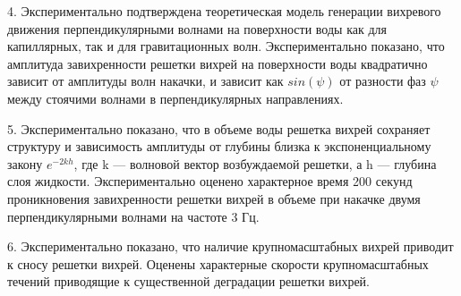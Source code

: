 4. Экспериментально подтверждена теоретическая модель генерации вихревого движения перпендикулярными волнами на поверхности воды как для капиллярных, так и для гравитационных волн. Экспериментально показано, что амплитуда завихренности решетки вихрей на поверхности воды квадратично зависит от амплитуды волн накачки, и зависит как $sin(\psi)$ от разности фаз $\psi$ между стоячими волнами в перпендикулярных направлениях. 

5. Экспериментально показано, что в объеме воды решетка вихрей сохраняет структуру и зависимость амплитуды от глубины близка к экспоненциальному закону $e^{-2kh}$, где k — волновой вектор возбуждаемой решетки, а h — глубина слоя жидкости. 
Экспериментально оценено характерное время 200 секунд проникновения завихренности решетки вихрей в объеме при накачке двумя перпендикулярными волнами на частоте 3 Гц.

6. Экспериментально показано, что наличие крупномасштабных вихрей приводит к сносу решетки вихрей. Оценены характерные скорости крупномасштабных течений приводящие к существенной деградации решетки вихрей.


